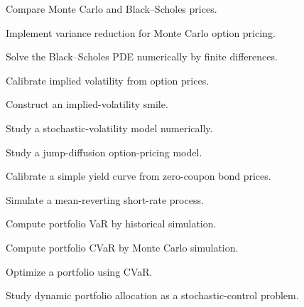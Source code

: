 \begin{exercise}[4]
Compare Monte Carlo and Black--Scholes prices.
\end{exercise}

\begin{exercise}[4]
Implement variance reduction for Monte Carlo option pricing.
\end{exercise}

\begin{exercise}[4]
Solve the Black--Scholes PDE numerically by finite differences.
\end{exercise}

\begin{exercise}[4]
Calibrate implied volatility from option prices.
\end{exercise}

\begin{exercise}[4]
Construct an implied-volatility smile.
\end{exercise}

\begin{exercise}[4]
Study a stochastic-volatility model numerically.
\end{exercise}

\begin{exercise}[4]
Study a jump-diffusion option-pricing model.
\end{exercise}

\begin{exercise}[4]
Calibrate a simple yield curve from zero-coupon bond prices.
\end{exercise}

\begin{exercise}[4]
Simulate a mean-reverting short-rate process.
\end{exercise}

\begin{exercise}[4]
Compute portfolio VaR by historical simulation.
\end{exercise}

\begin{exercise}[4]
Compute portfolio CVaR by Monte Carlo simulation.
\end{exercise}

\begin{exercise}[4]
Optimize a portfolio using CVaR.
\end{exercise}

\begin{exercise}[4]
Study dynamic portfolio allocation as a stochastic-control problem.
\end{exercise}

